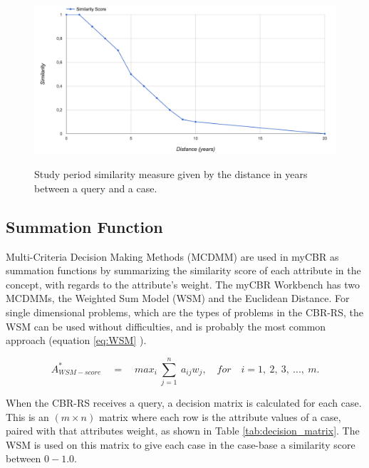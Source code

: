 \begin{figure}[h]
    \centering
    \caption[Study period similarity measure]{Study period similarity measure given by the distance in years between a query and a case.}
    \includegraphics[width=1.0\textwidth]{fig/study_period_graph.png}
    \label{fig:study_period_graph}
\end{figure}

\subsection{Summation Function}

Multi-Criteria Decision Making Methods (MCDMM) are used in myCBR as summation functions by summarizing the similarity score of each attribute in the concept, with regards to the attribute's weight. The myCBR Workbench has two MCDMMs, the Weighted Sum Model (WSM) and the Euclidean Distance. For single dimensional problems, which are the types of problems in the CBR-RS, the WSM can be used without difficulties, and is probably the most common approach \cite{triantaphyllou2000multi} (equation \ref{eq:WSM} \cite{fishburn1967letter}).

\begin{equation} \label{eq:WSM}
    A^{*}_{WSM-score}\quad =\quad max_{i}\  \sum\limits_{j = 1}^{n}\  a_{ij}w_{j},\quad for \quad i =1,\ 2,\ 3,\ ...,\ m.
\end{equation}

When the CBR-RS receives a query, a decision matrix is calculated for each case. This is an $(m \times n)$ matrix where each row is the attribute values of a case, paired with that attributes weight, as shown in Table \ref{tab:decision_matrix}. The WSM is used on this matrix to give each case in the case-base a similarity score between $0-1.0$.


